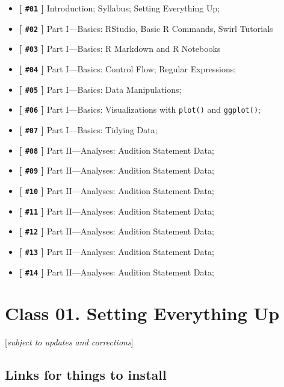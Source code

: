 \documentclass[
]{book}
\providecommand{\tightlist}{%
  \setlength{\itemsep}{0pt}\setlength{\parskip}{0pt}}
\begin{document}
\begin{itemize}
\tightlist
\item
  \textbf{{[} \texttt{\#01} {]}} Introduction; Syllabus; Setting Everything Up;
\item
  \textbf{{[} \texttt{\#02} {]}} Part I---Basics: RStudio, Basic R Commands, Swirl Tutorials
\item
  \textbf{{[} \texttt{\#03} {]}} Part I---Basics: R Markdown and R Notebooks
\item
  \textbf{{[} \texttt{\#04} {]}} Part I---Basics: Control Flow; Regular Expressions;
\item
  \textbf{{[} \texttt{\#05} {]}} Part I---Basics: Data Manipulations;
\item
  \textbf{{[} \texttt{\#06} {]}} Part I---Basics: Visualizations with \texttt{plot()} and \texttt{ggplot()};
\item
  \textbf{{[} \texttt{\#07} {]}} Part I---Basics: Tidying Data;
\item
  \textbf{{[} \texttt{\#08} {]}} Part II---Analyses: Audition Statement Data;
\item
  \textbf{{[} \texttt{\#09} {]}} Part II---Analyses: Audition Statement Data;
\item
  \textbf{{[} \texttt{\#10} {]}} Part II---Analyses: Audition Statement Data;
\item
  \textbf{{[} \texttt{\#11} {]}} Part II---Analyses: Audition Statement Data;
\item
  \textbf{{[} \texttt{\#12} {]}} Part II---Analyses: Audition Statement Data;
\item
  \textbf{{[} \texttt{\#13} {]}} Part II---Analyses: Audition Statement Data;
\item
  \textbf{{[} \texttt{\#14} {]}} Part II---Analyses: Audition Statement Data;
\end{itemize}

\hypertarget{class-01.-setting-everything-up}{%
\chapter{Class 01. Setting Everything Up}\label{class-01.-setting-everything-up}}

{[}\emph{subject to updates and corrections}{]}

\hypertarget{links-for-things-to-install}{%
\section{Links for things to install}\label{links-for-things-to-install}}
\end{document}
